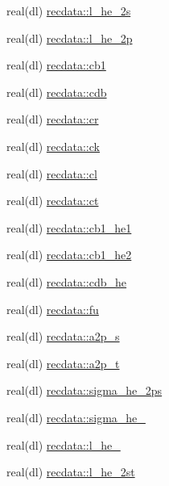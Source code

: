 \begin{DoxyCompactItemize}
\item 
real(dl) \mbox{\hyperlink{namespacerecdata_a92c403d880fb9d689ce3cd14be2a9419}{recdata\+::l\+\_\+he\+\_\+2s}}
\item 
real(dl) \mbox{\hyperlink{namespacerecdata_a2be433bb2e316e0518793af163f2d5ce}{recdata\+::l\+\_\+he\+\_\+2p}}
\item 
real(dl) \mbox{\hyperlink{namespacerecdata_a7e7a0ff371efd261f699832dc5f2d2a4}{recdata\+::cb1}}
\item 
real(dl) \mbox{\hyperlink{namespacerecdata_a0b6cc26e2d2688842af68cd27723b349}{recdata\+::cdb}}
\item 
real(dl) \mbox{\hyperlink{namespacerecdata_a8ab4f6bed512cd3707c9ee47b17b888c}{recdata\+::cr}}
\item 
real(dl) \mbox{\hyperlink{namespacerecdata_aba2f0c8512427aa917fc8cac8bc0ec4e}{recdata\+::ck}}
\item 
real(dl) \mbox{\hyperlink{namespacerecdata_ab68a51a351429e593781556b05330c60}{recdata\+::cl}}
\item 
real(dl) \mbox{\hyperlink{namespacerecdata_a5b074d69ad1a7e5c8ec138af8ca09905}{recdata\+::ct}}
\item 
real(dl) \mbox{\hyperlink{namespacerecdata_a0632faea1d88dcd7d279c24c08910ed3}{recdata\+::cb1\+\_\+he1}}
\item 
real(dl) \mbox{\hyperlink{namespacerecdata_af94354830fdc5a327a28087bff0bff81}{recdata\+::cb1\+\_\+he2}}
\item 
real(dl) \mbox{\hyperlink{namespacerecdata_a158d229f115a9b6b137ba43b674bf626}{recdata\+::cdb\+\_\+he}}
\item 
real(dl) \mbox{\hyperlink{namespacerecdata_a29419b5fe5c4de5d80938025601d4eb9}{recdata\+::fu}}
\item 
real(dl) \mbox{\hyperlink{namespacerecdata_ab0a23c356e59d53950e7536cf79fe3cd}{recdata\+::a2p\+\_\+s}}
\item 
real(dl) \mbox{\hyperlink{namespacerecdata_a34c7f7e2605d273b585ab3de74345d16}{recdata\+::a2p\+\_\+t}}
\item 
real(dl) \mbox{\hyperlink{namespacerecdata_af22595aa05fb59f5a5b0b8d55c3c5125}{recdata\+::sigma\+\_\+he\+\_\+2ps}}
\item 
real(dl) \mbox{\hyperlink{namespacerecdata_a5d432a7f8ed1a614dbc48413e8c4540a}{recdata\+::sigma\+\_\+he\+\_\+2pt}}
\item 
real(dl) \mbox{\hyperlink{namespacerecdata_a0961b37240c725eeb78661e93ed840d5}{recdata\+::l\+\_\+he\+\_\+2pt}}
\item 
real(dl) \mbox{\hyperlink{namespacerecdata_a3c04537ed51f41795d984b8796437d62}{recdata\+::l\+\_\+he\+\_\+2st}}

\end{DoxyCompactItemize}
